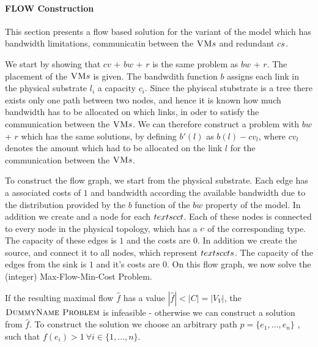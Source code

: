 \paragraph{FLOW Construction}

This section presents a flow based solution for the variant of the model which 
has bandwidth limitations, communicatin between the $\textsc{VM} s$ and redundant 
$c s$.

We start by showing that $cv$ + $bw$ + $r$ is the same problem as $bw$ + $r$. 
The placement of the $\textsc{VM} s$ is given. The bandwdith function $b$ assigns 
each link in the physical substrate $l_i$ a capacity $c_i$. Since the phyiscal 
stubstrate is a tree there exists only one path between two nodes, and hence it 
is known how much bandwidth has to be allocated on which links, in oder to 
satisfy the communication between the $\textsc{VM} s$. We can therefore construct a 
problem with $bw$ + $r$ which has the same solutions, by defining $b'(l)$ as 
$b(l) - cv_l$, where $cv_l$ denotes the amount which had to be allocated on the 
link $l$ for the communication between the $\textsc{VM} s$.

To construct the flow graph, we start from the physical 
substrate. Each edge has a associated costs of $1$ and bandwidth according the 
available bandwidth due to the distribution provided by the $b$ function of the 
$bw$ property of the model. In addition we create and a node for each 
$textsc{ct}$. Each of these nodes is connected to every node in the physical 
topology, which has a $c$ of the corresponding type. The capacity of these 
edges is $1$ and the costs are $0$. In addition we create the source, and 
connect it to all nodes, which represent $textsc{ct} s$. The capacity of the 
edges from the sink is $1$ and it's costs are $0$.
On this flow graph, we now solve the (integer) Max-Flow-Min-Cost Problem.

If the resulting maximal flow $\hat f$ has a value $|\hat f|< |C| = |V_V|$, the 
$\textsc{DummyName Problem}$ is infeasible - otherwise we can construct a solution from $\hat f$. 
To construct the solution we choose an arbitrary path $p = \{e_1,\dots, 
e_n\}$ , such that $f(e_i) > 1 ~ \forall i \in 
\{1,\dots,n\}$.